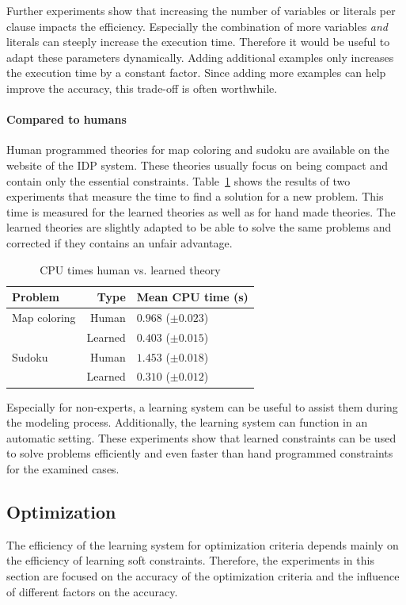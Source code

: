 \documentclass{llncs}
\begin{document}
Further experiments show that increasing the number of variables or literals per clause impacts the efficiency.
Especially the combination of more variables \emph{and} literals can steeply increase the execution time.
Therefore it would be useful to adapt these parameters dynamically.
Adding additional examples only increases the execution time by a constant factor.
Since adding more examples can help improve the accuracy, this trade-off is often worthwhile.

\paragraph{Compared to humans}
Human programmed theories for map coloring and sudoku are available on the website of the IDP system.
These theories usually focus on being compact and contain only the essential constraints.
Table~\ref{tbl:mens} shows the results of two experiments that measure the time to find a solution for a new problem.
This time is measured for the learned theories as well as for hand made theories.
The learned theories are slightly adapted to be able to solve the same problems and corrected if they contains an unfair advantage.
  \begin{table}
    \caption{CPU times human vs. learned theory}
    \begin{tabularx}{\linewidth}{lr|X}
      \textbf{Problem} & \textbf{Type} & \textbf{Mean CPU time (s)} \\
      \toprule
      Map coloring & Human & $0.968$  ($\pm 0.023$) \\
      & Learned & $0.403$       ($\pm 0.015$) \\
      \midrule
      Sudoku & Human & $1.453$    ($\pm 0.018$) \\ 
      & Learned & $0.310$       ($\pm 0.012$)
    \end{tabularx}
    \label{tbl:mens}
  \end{table}

Especially for non-experts, a learning system can be useful to assist them during the modeling process.
Additionally, the learning system can function in an automatic setting.
These experiments show that learned constraints can be used to solve problems efficiently and even faster than hand programmed constraints for the examined cases.

\subsection{Optimization}
The efficiency of the learning system for optimization criteria depends mainly on the efficiency of learning soft constraints.
Therefore, the experiments in this section are focused on the accuracy of the optimization criteria and the influence of different factors on the accuracy.
\end{document}
